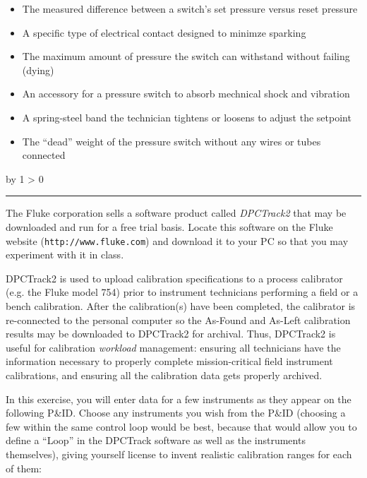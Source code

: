 \documentclass[12pt,a4paper]{article}
\def\oppgave{
            \advance\questnum by 1
            \ifnum \questnum > 0
                 \hrule
                 \vskip 3pt
                 \leftline{Oppgave \the\questnum}
                 \vskip 3pt \fi}
\begin{document}
\begin{itemize}
\item{} The measured difference between a switch's set pressure versus reset pressure
\vskip 5pt 
\item{} A specific type of electrical contact designed to minimze sparking
\vskip 5pt 
\item{} The maximum amount of pressure the switch can withstand without failing (dying)
\vskip 5pt 
\item{} An accessory for a pressure switch to absorb mechnical shock and vibration
\vskip 5pt 
\item{} A spring-steel band the technician tightens or loosens to adjust the setpoint
\vskip 5pt 
\item{} The ``dead'' weight of the pressure switch without any wires or tubes connected
\end{itemize}




\vfil \eject 



\oppgave{} 

The Fluke corporation sells a software product called {\it DPCTrack2} that may be downloaded and run for a free trial basis.  Locate this software on the Fluke website ({\tt http://www.fluke.com}) and download it to your PC so that you may experiment with it in class.

DPCTrack2 is used to upload calibration specifications to a process calibrator (e.g. the Fluke model 754) prior to instrument technicians performing a field or a bench calibration.  After the calibration(s) have been completed, the calibrator is re-connected to the personal computer so the As-Found and As-Left calibration results may be downloaded to DPCTrack2 for archival.  Thus, DPCTrack2 is useful for calibration {\it workload} management: ensuring all technicians have the information necessary to properly complete mission-critical field instrument calibrations, and ensuring all the calibration data gets properly archived.

\vskip 10pt

In this exercise, you will enter data for a few instruments as they appear on the following P\&ID.  Choose any instruments you wish from the P\&ID (choosing a few within the same control loop would be best, because that would allow you to define a ``Loop'' in the DPCTrack software as well as the instruments themselves), giving yourself license to invent realistic calibration ranges for each of them:
\end{document}
